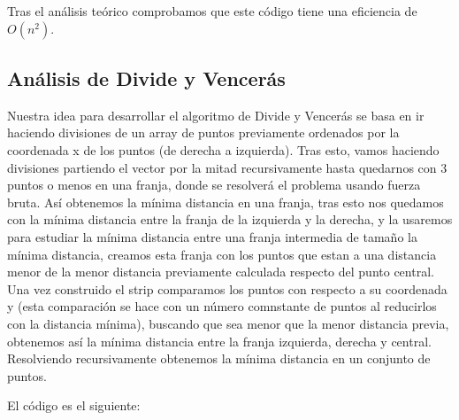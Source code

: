\documentclass[a4paper,12pt]{article}
\begin{document}
Tras el análisis teórico comprobamos que este código tiene una eficiencia de $O(n^2)$.

\subsection{Análisis de Divide y Vencerás}
Nuestra idea para desarrollar el algoritmo de Divide y Vencerás se basa en ir haciendo divisiones
de un array de puntos previamente ordenados por la coordenada x de los puntos (de derecha a izquierda).
Tras esto, vamos haciendo divisiones partiendo el vector por la mitad recursivamente hasta quedarnos con 3 
puntos o menos en una franja, donde se resolverá el problema usando fuerza bruta. Así obtenemos la mínima distancia 
en una franja, tras esto nos quedamos con la mínima distancia entre la franja de la izquierda y la derecha, y la 
usaremos para estudiar la mínima distancia entre una franja intermedia de tamaño la mínima distancia, creamos esta franja 
con los puntos que estan a una distancia menor de la menor distancia previamente calculada respecto del punto central.
Una vez construido el strip comparamos los puntos con respecto a su coordenada y (esta comparación se hace con un 
número comnstante de puntos al reducirlos con la distancia mínima), buscando que sea menor que la menor distancia previa,
obtenemos así la mínima distancia entre la franja izquierda, derecha y central. Resolviendo recursivamente obtenemos 
la mínima distancia en un conjunto de puntos.

El código es el siguiente:
\end{document}
